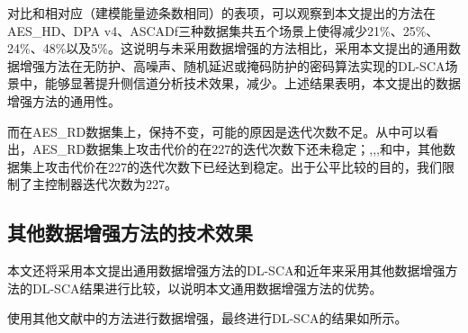 {	对比和相对应（建模能量迹条数相同）的表项，可以观察到本文提出的方法在AES\_HD、DPA v4、ASCADf三种数据集共五个场景上使得\chenggongtiaoshu 减少21\%、25\%、24\%、48\%以及5\%。这说明与未采用数据增强的方法相比，采用本文提出的通用数据增强方法在无防护、高噪声、随机延迟或掩码防护的密码算法实现的DL-SCA场景中，能够显著提升侧信道分析技术效果，减少\chenggongtiaoshu 。上述结果表明，本文提出的数据增强方法的通用性。
	
	而在AES\_RD数据集上，\chenggongtiaoshu 保持不变，可能的原因是迭代次数不足。从中可以看出，AES\_RD数据集上攻击代价的在227的迭代次数下还未稳定；,,,和中，其他数据集上攻击代价在227的迭代次数下已经达到稳定。出于公平比较的目的，我们限制了主控制器迭代次数为227。
	
%
	\subsection{其他数据增强方法的技术效果}

	本文还将采用本文提出通用数据增强方法的DL-SCA和近年来采用其他数据增强方法的DL-SCA结果进行比较，以说明本文通用数据增强方法的优势。
	
	使用其他文献中的方法进行数据增强，最终进行DL-SCA的结果如所示。
	

}
